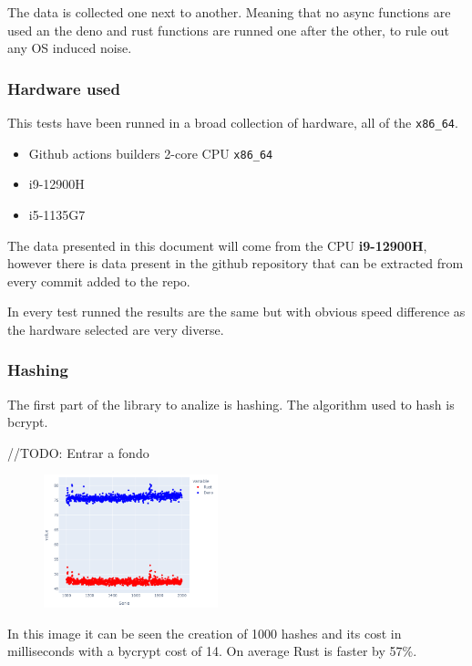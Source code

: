 \documentclass[12pt, letterpaper]{article}
\begin{document}
\begin{multicols}{2}
    The data is collected one next to another. Meaning that no async functions are used an the deno and rust functions are runned one after the other, to rule out any OS induced noise.

    \subsubsection{Hardware used}

    This tests have been runned in a broad collection of hardware, all of the \verb|x86_64|.

    \begin{itemize}
        \item Github actions builders 2-core CPU \verb|x86_64|
        \item i9-12900H
        \item i5-1135G7
    \end{itemize}

    The data presented in this document will come from the CPU \textbf{i9-12900H}, however there is data present in the github repository that can be extracted from every commit added to the repo.

    In every test runned the results are the same but with obvious speed difference as the hardware selected are very diverse.

    \subsubsection{Hashing}

    The first part of the library to analize is hashing. The algorithm used to hash is bcrypt.

    //TODO: Entrar a fondo

    \begin{figure}[H]
        \centering
        \includegraphics[width=0.45\textwidth]{hashing_lines}
    \end{figure}

    In this image it can be seen the creation of 1000 hashes and its cost in milliseconds with a bycrypt cost of 14. On average Rust is faster by 57\%.


\end{multicols}
\end{document}
